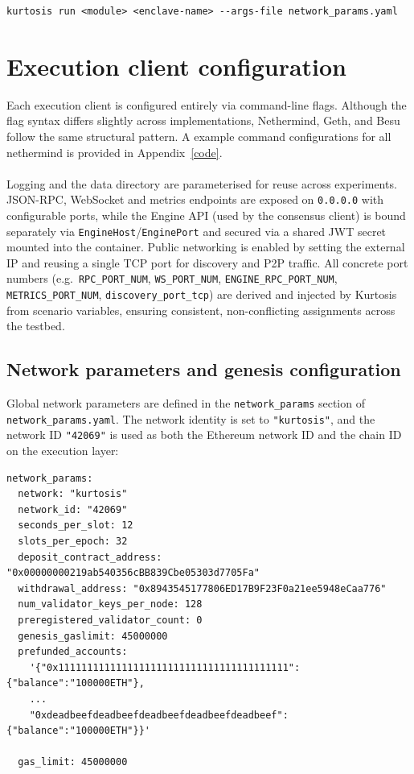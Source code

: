 \begin{lstlisting}[caption={Example Kurtosis command used to start an experiment},label={lst:kurtosis-cli}]
kurtosis run <module> <enclave-name> --args-file network_params.yaml
\end{lstlisting}

\section{Execution client configuration}
\label{sec:exec-client-config}

Each execution client is configured entirely via command-line flags. Although the flag syntax differs slightly across implementations, Nethermind, Geth, and Besu follow the same structural pattern. A example command configurations for all nethermind is provided in Appendix~\ref{code}.
\\
\\
Logging and the data directory are parameterised for reuse across experiments. JSON-RPC, WebSocket and metrics endpoints are exposed on \texttt{0.0.0.0} with configurable ports, while the Engine API (used by the consensus client) is bound separately via \texttt{EngineHost}/\texttt{EnginePort} and secured via a shared JWT secret mounted into the container. Public networking is enabled by setting the external IP and reusing a single TCP port for discovery and P2P traffic. All concrete port numbers (e.g.\ \texttt{RPC\_PORT\_NUM}, \texttt{WS\_PORT\_NUM}, \texttt{ENGINE\_RPC\_PORT\_NUM}, \texttt{METRICS\_PORT\_NUM}, \texttt{discovery\_port\_tcp}) are derived and injected by Kurtosis from scenario variables, ensuring consistent, non-conflicting assignments across the testbed.

\subsection{Network parameters and genesis configuration}

Global network parameters are defined in the \texttt{network\_params} section of \texttt{network\_params.yaml}. The network identity is set to \texttt{"kurtosis"}, and the network ID \texttt{"42069"} is used as both the Ethereum network ID and the chain ID on the execution layer:

\begin{lstlisting}[caption={Global network parameters and genesis configuration},label={lst:network-params}]
network_params:
  network: "kurtosis"
  network_id: "42069"
  seconds_per_slot: 12
  slots_per_epoch: 32
  deposit_contract_address: "0x00000000219ab540356cBB839Cbe05303d7705Fa"
  withdrawal_address: "0x8943545177806ED17B9F23F0a21ee5948eCaa776"
  num_validator_keys_per_node: 128
  preregistered_validator_count: 0
  genesis_gaslimit: 45000000
  prefunded_accounts:
    '{"0x1111111111111111111111111111111111111111":{"balance":"100000ETH"},
    ...
    "0xdeadbeefdeadbeefdeadbeefdeadbeefdeadbeef":{"balance":"100000ETH"}}'

  gas_limit: 45000000
\end{lstlisting}

